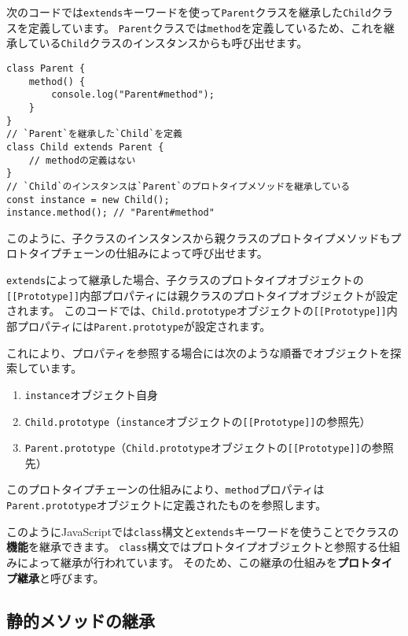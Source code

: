 次のコードでは\texttt{extends}キーワードを使って\texttt{Parent}クラスを継承した\texttt{Child}クラスを定義しています。
\texttt{Parent}クラスでは\texttt{method}を定義しているため、これを継承している\texttt{Child}クラスのインスタンスからも呼び出せます。

\begin{lstlisting}
class Parent {
    method() {
        console.log("Parent#method");
    }
}
// `Parent`を継承した`Child`を定義
class Child extends Parent {
    // methodの定義はない
}
// `Child`のインスタンスは`Parent`のプロトタイプメソッドを継承している
const instance = new Child();
instance.method(); // "Parent#method"
\end{lstlisting}

このように、子クラスのインスタンスから親クラスのプロトタイプメソッドもプロトタイプチェーンの仕組みによって呼び出せます。

\texttt{extends}によって継承した場合、子クラスのプロトタイプオブジェクトの\texttt{[[Prototype]]}内部プロパティには親クラスのプロトタイプオブジェクトが設定されます。
このコードでは、\texttt{Child.prototype}オブジェクトの\texttt{[[Prototype]]}内部プロパティには\texttt{Parent.prototype}が設定されます。

これにより、プロパティを参照する場合には次のような順番でオブジェクトを探索しています。

\begin{enumerate}
\def\labelenumi{\arabic{enumi}.}
\item
  \texttt{instance}オブジェクト自身
\item
  \texttt{Child.prototype}（\texttt{instance}オブジェクトの\texttt{[[Prototype]]}の参照先）
\item
  \texttt{Parent.prototype}（\texttt{Child.prototype}オブジェクトの\texttt{[[Prototype]]}の参照先）
\end{enumerate}

このプロトタイプチェーンの仕組みにより、\texttt{method}プロパティは\texttt{Parent.prototype}オブジェクトに定義されたものを参照します。

このようにJavaScriptでは\texttt{class}構文と\texttt{extends}キーワードを使うことでクラスの\textbf{機能}を継承できます。
\texttt{class}構文ではプロトタイプオブジェクトと参照する仕組みによって継承が行われています。
そのため、この継承の仕組みを\textbf{プロトタイプ継承}と呼びます。

\hypertarget{static-inheritance}{%
\subsection{静的メソッドの継承}\label{static-inheritance}}

